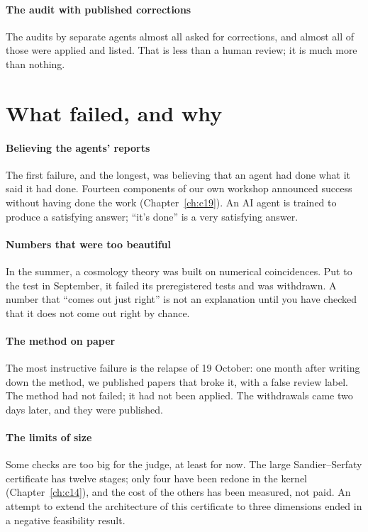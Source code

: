 \paragraph{The audit with published corrections} The audits by separate agents almost all asked for corrections, and
almost all of those were applied and listed. That is less than a human review; it is much more than nothing.

\section{What failed, and why}

\paragraph{Believing the agents' reports} The first failure, and the longest, was believing that an agent had done what
it said it had done. Fourteen components of our own workshop announced success without having done the work
(Chapter~\ref{ch:c19}). An AI agent is trained to produce a satisfying answer; ``it's done'' is a very satisfying
answer.

\paragraph{Numbers that were too beautiful} In the summer, a cosmology theory was built on numerical coincidences. Put
to the test in September, it failed its preregistered tests and was withdrawn. A number that ``comes out just right''
is not an explanation until you have checked that it does not come out right by chance.

\paragraph{The method on paper} The most instructive failure is the relapse of 19 October: one month after writing down
the method, we published papers that broke it, with a false review label. The method had not failed; it had not been
applied. The withdrawals came two days later, and they were published.

\paragraph{The limits of size} Some checks are too big for the judge, at least for now. The large Sandier--Serfaty
certificate has twelve stages; only four have been redone in the kernel (Chapter~\ref{ch:c14}), and the cost of the
others has been measured, not paid. An attempt to extend the architecture of this certificate to three dimensions
ended in a negative feasibility result.

